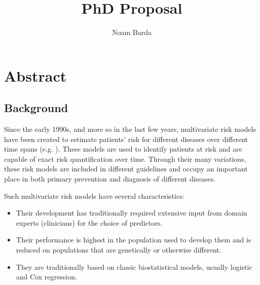 \documentclass[a4paper,12pt]{article}
\begin{document}
	
	\title{PhD Proposal}
	\author{Noam Barda}
	\maketitle
	
	\tableofcontents
	\newpage
	
	\section{Abstract}
	
		\subsection{Background}
		Since the early 1990s, and more so in the last few years,  multivariate risk models have been created to estimate patients' risk for different diseases over different time spans (e.g. \cite{Wilson1998,Conroy2003,DAgostino2008}). These models are used to identify patients at risk and are capable of exact risk quantification over time\cite{Goff2014}. Through their many variations, these risk models are included in different guidelines and occupy an important place in both primary prevention and diagnosis of different diseases\cite{Graham2007,Goff2014}.
	
		Such multivariate risk models have several characteristics:
		\begin{itemize}
			\item Their development has traditionally required extensive input from domain experts (clinicians) for the choice of predictors.
			\item Their performance is highest in the population used to develop them and is reduced on populations that are genetically or otherwise different\cite{DAgostino2001,Bastuji-Garin2002,DeFilippis2015}.
			\item They are traditionally based on classic biostatistical models, usually logistic and Cox regression.
		\end{itemize}
	
\end{document}
